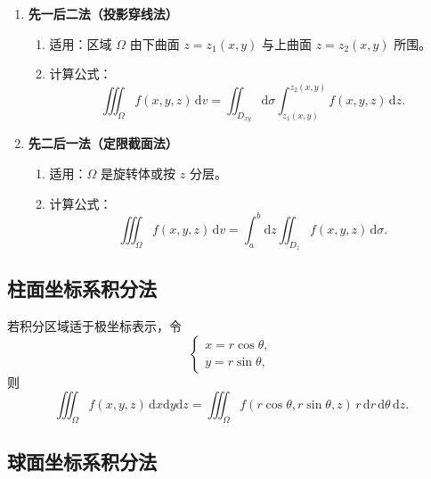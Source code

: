 \begin{enumerate}
      \item \textbf{先一后二法（投影穿线法）}
            \begin{enumerate}
                  \item 适用：区域 $\Omega$ 由下曲面 $z=z_1(x,y)$ 与上曲面 $z=z_2(x,y)$ 所围。
                  \item 计算公式：
                        \[
                              \iiint_{\Omega} f(x,y,z)\, \mathrm{d}v
                              = \iint_{D_{xy}} \mathrm{d}\sigma
                              \int_{z_1(x,y)}^{z_2(x,y)} f(x,y,z)\, \mathrm{d}z.
                        \]
            \end{enumerate}

      \item \textbf{先二后一法（定限截面法）}
            \begin{enumerate}
                  \item 适用：$\Omega$ 是旋转体或按 $z$ 分层。
                  \item 计算公式：
                        \[
                              \iiint_{\Omega} f(x,y,z)\, \mathrm{d}v
                              = \int_{a}^{b} \mathrm{d}z
                              \iint_{D_z} f(x,y,z)\, \mathrm{d}\sigma.
                        \]
            \end{enumerate}
\end{enumerate}

\subsection{柱面坐标系积分法}

若积分区域适于极坐标表示，令
\[
      \begin{cases}
            x = r\cos\theta, \\
            y = r\sin\theta,
      \end{cases}
\]
则
\[
      \iiint_{\Omega} f(x,y,z)\, \mathrm{d}x\mathrm{d}y\mathrm{d}z
      = \iiint_{\Omega} f(r\cos\theta,r\sin\theta,z)\, r\, \mathrm{d}r\,\mathrm{d}\theta\,\mathrm{d}z.
\]

\subsection{球面坐标系积分法}


